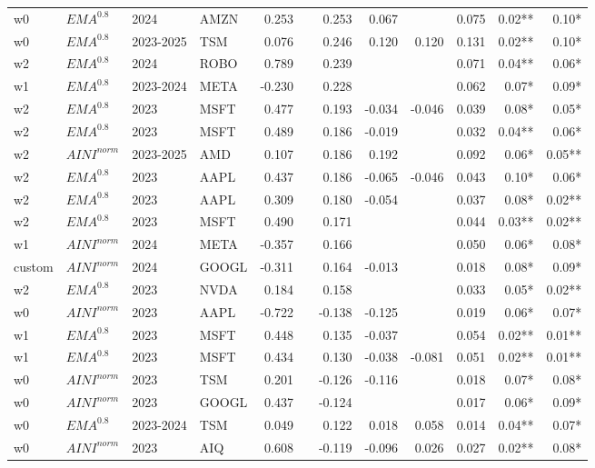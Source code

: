 {\begin{tabularx}{\textwidth}{@{}X@{\hspace{0.5pt}}X@{\hspace{0.5pt}}X@{\hspace{0.5pt}}X@{\hspace{2.0pt}} r r r r r r r r@{}}
w0 & $EMA^{0.8}$ & 2024 & AMZN & 0.253 &  & 0.253 & 0.067 &  & 0.075 & 0.02** & 0.10* \\
w0 & $EMA^{0.8}$ & 2023-2025 & TSM & 0.076 &  & 0.246 & 0.120 & 0.120 & 0.131 & 0.02** & 0.10* \\
w2 & $EMA^{0.8}$ & 2024 & ROBO & 0.789 &  & 0.239 &  &  & 0.071 & 0.04** & 0.06* \\
w1 & $EMA^{0.8}$ & 2023-2024 & META & -0.230 &  & 0.228 &  &  & 0.062 & 0.07* & 0.09* \\
w2 & $EMA^{0.8}$ & 2023 & MSFT & 0.477 &  & 0.193 & -0.034 & -0.046 & 0.039 & 0.08* & 0.05* \\
w2 & $EMA^{0.8}$ & 2023 & MSFT & 0.489 &  & 0.186 & -0.019 &  & 0.032 & 0.04** & 0.06* \\
w2 & $AINI^{norm}$ & 2023-2025 & AMD & 0.107 &  & 0.186 & 0.192 &  & 0.092 & 0.06* & 0.05** \\
w2 & $EMA^{0.8}$ & 2023 & AAPL & 0.437 &  & 0.186 & -0.065 & -0.046 & 0.043 & 0.10* & 0.06* \\
w2 & $EMA^{0.8}$ & 2023 & AAPL & 0.309 &  & 0.180 & -0.054 &  & 0.037 & 0.08* & 0.02** \\
w2 & $EMA^{0.8}$ & 2023 & MSFT & 0.490 &  & 0.171 &  &  & 0.044 & 0.03** & 0.02** \\
w1 & $AINI^{norm}$ & 2024 & META & -0.357 &  & 0.166 &  &  & 0.050 & 0.06* & 0.08* \\
custom & $AINI^{norm}$ & 2024 & GOOGL & -0.311 &  & 0.164 & -0.013 &  & 0.018 & 0.08* & 0.09* \\
w2 & $EMA^{0.8}$ & 2023 & NVDA & 0.184 &  & 0.158 &  &  & 0.033 & 0.05* & 0.02** \\
w0 & $AINI^{norm}$ & 2023 & AAPL & -0.722 &  & -0.138 & -0.125 &  & 0.019 & 0.06* & 0.07* \\
w1 & $EMA^{0.8}$ & 2023 & MSFT & 0.448 &  & 0.135 & -0.037 &  & 0.054 & 0.02** & 0.01** \\
w1 & $EMA^{0.8}$ & 2023 & MSFT & 0.434 &  & 0.130 & -0.038 & -0.081 & 0.051 & 0.02** & 0.01** \\
w0 & $AINI^{norm}$ & 2023 & TSM & 0.201 &  & -0.126 & -0.116 &  & 0.018 & 0.07* & 0.08* \\
w0 & $AINI^{norm}$ & 2023 & GOOGL & 0.437 &  & -0.124 &  &  & 0.017 & 0.06* & 0.09* \\
w0 & $EMA^{0.8}$ & 2023-2024 & TSM & 0.049 &  & 0.122 & 0.018 & 0.058 & 0.014 & 0.04** & 0.07* \\
w0 & $AINI^{norm}$ & 2023 & AIQ & 0.608 &  & -0.119 & -0.096 & 0.026 & 0.027 & 0.02** & 0.08* \\

\end{tabularx}}
